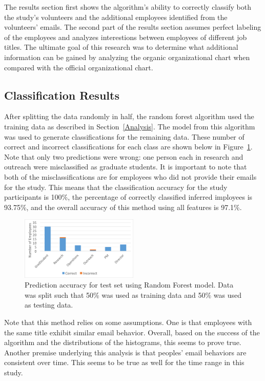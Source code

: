 \documentclass{article}
\begin{document}
The results section first shows the algorithm's ability to correctly classify both the study's volunteers and the additional employees identified from the volunteers' emails.  The second part of the results section assumes perfect labeling of the employees and analyzes interestions between employees of different job titles.  The ultimate goal of this research was to determine what additional information can be gained by analyzing the organic organizational chart when compared with the official organizational chart.

\subsection{Classification Results}
After splitting the data randomly in half, the random forest algorithm used the training data as described in Section~\ref{Analysis}.  The model from this algorithm was used to generate classifications for the  remaining data.  These number of correct and incorrect classifications for each class are shown below in Figure~\ref{fig:result_hist}.  Note that only two predictions were wrong: one person each in research and outreach were misclassified as graduate students.  It is important to note that both of the misclassifications are for employees who did not provide their emails for the study.  This means that the classification accuracy for the study participants is 100\%, the percentage of correctly classified inferred imployees is 93.75\%, and the overall accuracy of this method using all features is 97.1\%.  

\begin{figure}[H]
    \centering
        \includegraphics[width=0.5\textwidth]{Prediction_50_50_RF}
        \caption{Prediction accuracy for test set using Random Forest model.  Data was split such that 50\% was used as training data and 50\% was used as testing data.}
        \label{fig:result_hist}
\end{figure}

Note that this method relies on some assumptions.  One is that employees with the same title exhibit similar email behavior.  Overall, based on the success of the algorithm and the distributions of the histograms, this seems to prove true.  Another premise underlying this analysis is that peoples' email behaviors are consistent over time.  This seems to be true as well for the time range in this study.
\end{document}
